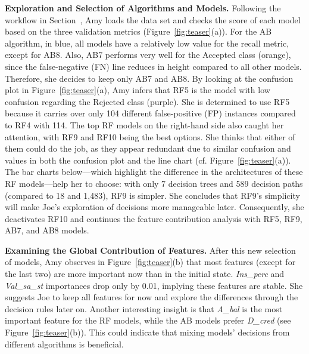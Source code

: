 \textbf{Exploration and Selection of Algorithms and Models.} Following the workflow in Section~, Amy loads the data set and checks the score of each model based on the three validation metrics (Figure~\ref{fig:teaser}(a)). For the AB algorithm, in blue, all models have a relatively low value for the recall metric, except for AB8. Also, AB7 performs very well for the Accepted class (orange), since the false-negative (FN) line reduces in height compared to all other models. Therefore, she decides to keep only AB7 and AB8. By looking at the confusion plot in Figure~\ref{fig:teaser}(a), Amy infers that RF5 is the model with low confusion regarding the Rejected class (purple). She is determined to use RF5 because it carries over only 104 different false-positive (FP) instances compared to RF4 with 114. The top RF models on the right-hand side also caught her attention, with RF9 and RF10 being the best options. She thinks that either of them could do the job, as they appear redundant due to similar confusion and values in both the confusion plot and the line chart (cf. Figure~\ref{fig:teaser}(a)). The bar charts below---which highlight the difference in the architectures of these RF models---help her to choose: with only 7 decision trees and 589 decision paths (compared to 18 and 1,483), RF9 is simpler. She concludes that RF9's simplicity will make Joe's exploration of decisions more manageable later. Consequently, she deactivates RF10 and continues the feature contribution analysis with RF5, RF9, AB7, and AB8 models.

\textbf{Examining the Global Contribution of Features.} After this new selection of models, Amy observes in Figure~\ref{fig:teaser}(b) that most features (except for the last two) are more important now than in the initial state. \emph{Ins\_perc} and \emph{Val\_sa\_st} importances drop only by 0.01, implying these features are stable. She suggests Joe to keep all features for now and explore the differences through the decision rules later on. Another interesting insight is that \emph{A\_bal} is the most important feature for the RF models, while the AB models prefer \emph{D\_cred} (see Figure~\ref{fig:teaser}(b)). This could indicate that mixing models' decisions from different algorithms is beneficial. 

